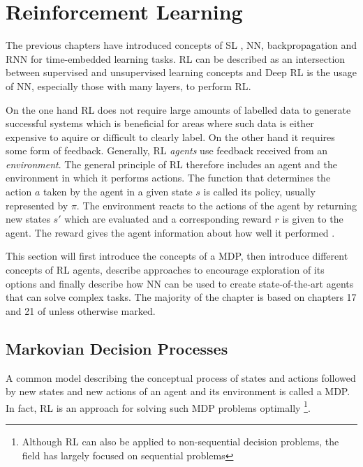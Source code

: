\section{Reinforcement Learning}

The previous chapters have introduced concepts of \ac{SL} , \ac{NN}, backpropagation and \ac{RNN} for time-embedded
learning tasks. \ac{RL} can be described as an intersection between supervised and unsupervised learning concepts and
Deep \ac{RL} is the usage of \ac{NN}, especially those with many layers, to perform \ac{RL}.

On the one hand \ac{RL}  does not require large amounts of labelled data to generate successful systems which is
beneficial for areas where such data is either expensive to aquire or difficult to clearly label. On the other hand it
requires some form of feedback. Generally, \ac{RL} \emph{agents} use feedback received from an \emph{environment}.  The
general principle of \ac{RL} therefore includes an agent and the environment in which it performs actions. The function
that determines the action $a$  taken by the agent in a given state $s$ is called its policy, usually represented by
$\pi$.  The environment reacts to the actions of the agent by returning new states $s'$ which are evaluated and a
corresponding reward $r$ is given to the agent. The reward gives the agent information about how well it performed
\citep[p.830f.]{russell2016artificial}.

This section will first introduce the concepts of a \ac{MDP}, then introduce different concepts of \ac{RL} agents,
describe approaches to encourage exploration of its options and finally describe how \ac{NN} can be used to create
state-of-the-art agents that can solve complex tasks. The majority of the chapter is based on
chapters 17 and 21 of \citet[]{russell2016artificial} unless otherwise marked.

\subsection{Markovian Decision Processes}%
\label{ssub:markovian_decision_processes}

A common model describing the conceptual process of states and actions followed by new states and new actions of an
agent and its environment is called a \acf {MDP}. In fact, \ac{RL} is an approach for solving such \ac{MDP} problems
optimally
\footnote{Although \ac{RL} can also be applied to non-sequential decision problems, the field has largely focused on
sequential problems}.

